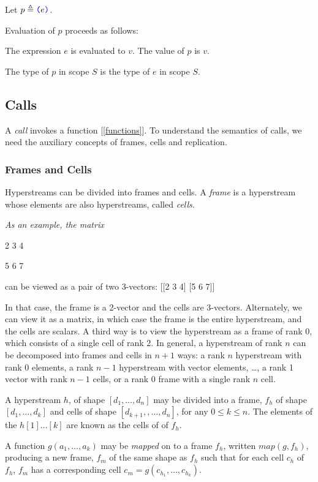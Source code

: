 \documentclass{article}
\begin{document}
\ParenthesizedExpression{}

Let $p \triangleq \texttt{\color{blue} (}{}e \texttt{\color{blue} )}{}$.

Evaluation of $p$ proceeds as follows:

The expression $e$ is evaluated to $v$. The value of $p$ is $v$.

The type of $p$ in scope $S$ is the type of $e$ in scope $S$.

\subsection{Calls}
\label{calls}

A {\em call} invokes a function [\ref{functions}]. To understand the semantics of calls, we need the auxiliary concepts of frames, cells and replication.


\subsubsection{Frames and Cells}
\label{framesAndCells}

Hyperstreams can be divided into frames and cells. A {\em frame} is a hyperstream whose elements are also hyperstreams, called {\em cells}.

{\em As an example, the matrix 

2 3 4

5 6 7

 can be viewed as a pair of two 3-vectors:
[[2 3 4] [5 6 7]]

In that case, the frame is a 2-vector and the cells are 3-vectors.  Alternately, we can view it as a matrix, in which case the frame is the entire hyperstream, and the cells are scalars. A third way is to view the hyperstream as a frame of rank 0, which consists of a single cell of rank 2. In general, a hyperstream of rank $n$ can be decomposed into frames and cells in $n+1$ ways: a rank $n$ hyperstream with rank 0 elements, a rank $n-1$ hyperstream with vector elements, …, a rank 1 vector with rank $n-1$ cells, or a rank 0 frame with a single rank $n$ cell.
}

A hyperstream $h$, of shape $[d_1, \ldots, d_n]$ may be divided into a frame, $f_h$ of shape $[d_1, \ldots, d_k]$ and cells of shape $[d_{k+1}, , \ldots, d_n]$, for any $0 \le k \le n$.
The elements of the $h[1] \ldots [k]$ are known as the cells of of $f_h$.

A function $g(a_1, \ldots, a_k)$ may be {\em mapped} on to a frame $f_h$, written $map(g, f_h)$, producing a new frame, $f_m$ of the same shape as $f_h$ such that for each cell $c_h$ of $f_h$, $f_m$ has a corresponding cell $c_m = g(c_{h_1}, \ldots, c_{h_k})$.
\end{document}
